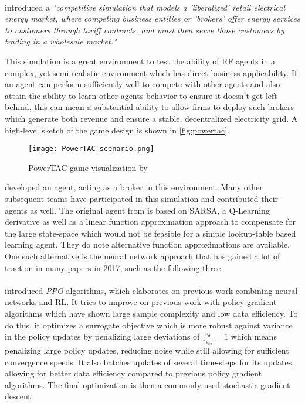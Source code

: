 \documentclass[12pt,a4paper]{article}
\begin{document}
\paragraph{\citeauthor{ketter2016powertac}} introduced a \emph{"competitive simulation that models a 'liberalized' retail electrical energy market,
where competing business entities or 'brokers' offer energy services to customers through tariff
contracts, and must then serve those customers by trading in a wholesale market."}

This simulation is a great environment to test the ability of \ac{RF} agents in a complex, yet semi-realistic environment which has direct business-applicability. If an agent can perform sufficiently well to compete with other agents and also attain the ability to learn other agents behavior to ensure it doesn't get left behind, this can mean a substantial ability to allow firms to deploy such brokers which generate both revenue and ensure a stable, decentralized electricity grid. A high-level sketch of the game design is shown in \autoref{fig:powertac}.

\begin{figure}[]
    \centering
    \texttt{[image: PowerTAC-scenario.png]}
    \caption{PowerTAC game visualization by \cite{ketter2016powertac}}
    \label{fig:powertac}
\end{figure}

\citeauthor{peters2013reinforcement} developed an agent, acting as a broker in this environment. Many other subsequent teams have participated in this simulation and contributed their agents as well. The original agent from \cite{peters2013reinforcement} is based on SARSA, a Q-Learning derivative as well as a linear function approximation approach to compensate for the large state-space which would not be feasible for a simple lookup-table based learning agent. They do note alternative function approximations are available. One such alternative is the neural network approach that has gained a lot of traction in many papers in 2017, such as the following three.

\paragraph{\citeauthor{proximalpolicyopt}} introduced \emph{\acf{PPO}} algorithms, which elaborates on previous work combining neural networks and \ac{RL}. It tries to improve on previous work with policy gradient algorithms which have shown large sample complexity and low data efficiency. To do this, it optimizes a surrogate objective which is more robust against variance in the policy updates by penalizing large deviations of $\frac{\pi_\theta}{\pi_{\theta_{old}}} = 1$ which means penalizing large policy updates, reducing noise while still allowing for sufficient convergence speeds. It also batches updates of several time-steps for its updates, allowing for better data efficiency compared to previous policy gradient algorithms. The final optimization is then a commonly used stochastic gradient descent.
\end{document}
